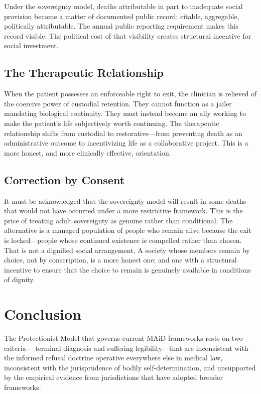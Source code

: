 \documentclass[11pt, letterpaper]{article}
\begin{document}
Under the sovereignty model, deaths attributable in part to inadequate social
provision become a matter of documented public record: citable, aggregable,
politically attributable. The annual public reporting requirement makes this record
visible. The political cost of that visibility creates structural incentive for
social investment.

\subsection{The Therapeutic Relationship}

When the patient possesses an enforceable right to exit, the clinician is
relieved of the coercive power of custodial retention. They cannot function as a
jailer mandating biological continuity. They must instead become an ally working
to make the patient's life subjectively worth continuing. The therapeutic
relationship shifts from custodial to restorative---from preventing death as
an administrative outcome to incentivizing life as a collaborative project. This
is a more honest, and more clinically effective, orientation.

\subsection{Correction by Consent}

It must be acknowledged that the sovereignty model will result in some deaths that
would not have occurred under a more restrictive framework. This is the price of
treating adult sovereignty as genuine rather than conditional. The alternative is
a managed population of people who remain alive because the exit is locked---people
whose continued existence is compelled rather than chosen. That is not a dignified
social arrangement. A society whose members remain by choice, not by conscription,
is a more honest one; and one with a structural incentive to ensure that the choice
to remain is genuinely available in conditions of dignity.

\section{Conclusion}

The Protectionist Model that governs current MAiD frameworks rests on two criteria---
terminal diagnosis and suffering legibility---that are inconsistent with the informed
refusal doctrine operative everywhere else in medical law, inconsistent with the
jurisprudence of bodily self-determination, and unsupported by the empirical evidence
from jurisdictions that have adopted broader frameworks.
\end{document}
